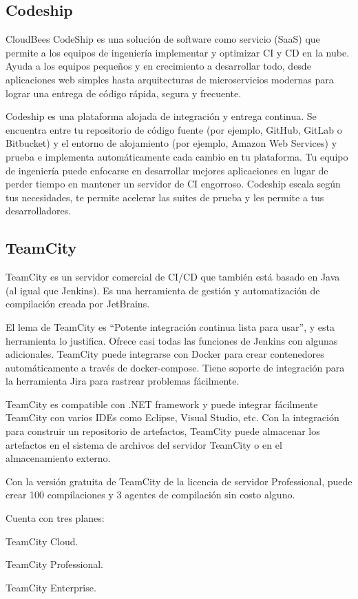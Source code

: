 \subsection{Codeship}
CloudBees CodeShip es una solución de software como servicio (SaaS) que permite a los equipos de ingeniería implementar y optimizar CI y CD en la nube. Ayuda a los equipos pequeños y en crecimiento a desarrollar todo, desde aplicaciones web simples hasta arquitecturas de microservicios modernas para lograr una entrega de código rápida, segura y frecuente.

Codeship es una plataforma alojada de integración y entrega continua. Se encuentra entre tu repositorio de código fuente (por ejemplo, GitHub, GitLab o Bitbucket) y el entorno de alojamiento (por ejemplo, Amazon Web Services) y prueba e implementa automáticamente cada cambio en tu plataforma. Tu equipo de ingeniería puede enfocarse en desarrollar mejores aplicaciones en lugar de perder tiempo en mantener un servidor de CI engorroso. Codeship escala según tus necesidades, te permite acelerar las suites de prueba y les permite a tus desarrolladores.

\subsection{TeamCity}
TeamCity es un servidor comercial de CI/CD que también está basado en Java (al igual que Jenkins). Es una herramienta de gestión y automatización de compilación creada por JetBrains.

El lema de TeamCity es “Potente integración continua lista para usar”, y esta herramienta lo justifica. Ofrece casi todas las funciones de Jenkins con algunas adicionales. TeamCity puede integrarse con Docker para crear contenedores automáticamente a través de docker-compose. Tiene soporte de integración para la herramienta Jira para rastrear problemas fácilmente.

TeamCity es compatible con .NET framework y puede integrar fácilmente TeamCity con varios IDEs como Eclipse, Visual Studio, etc. Con la integración para construir un repositorio de artefactos, TeamCity puede almacenar los artefactos en el sistema de archivos del servidor TeamCity o en el almacenamiento externo.

Con la versión gratuita de TeamCity de la licencia de servidor Professional, puede crear 100 compilaciones y 3 agentes de compilación sin costo alguno.

Cuenta con tres planes:
\begin{compactitem}
    \item TeamCity Cloud.
    \item TeamCity Professional.
    \item TeamCity Enterprise.
\end{compactitem}

